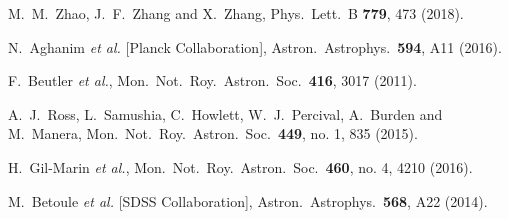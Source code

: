 \documentclass[aps,prd,nofootinbib,amsmath,amssymb,twocolumn,superscriptaddress,10pt]{revtex4}%
\begin{document}
\begin{thebibliography}{}
  M.~M.~Zhao, J.~F.~Zhang and X.~Zhang,
  Phys.\ Lett.\ B {\bf 779}, 473 (2018).

  N.~Aghanim {\it et al.} [Planck Collaboration],
  Astron.\ Astrophys.\  {\bf 594}, A11 (2016).




  F.~Beutler {\it et al.},
  Mon.\ Not.\ Roy.\ Astron.\ Soc.\  {\bf 416}, 3017 (2011).

  A.~J.~Ross, L.~Samushia, C.~Howlett, W.~J.~Percival, A.~Burden and M.~Manera,
  Mon.\ Not.\ Roy.\ Astron.\ Soc.\  {\bf 449}, no. 1, 835 (2015).

  H.~Gil-Marin {\it et al.},
  Mon.\ Not.\ Roy.\ Astron.\ Soc.\  {\bf 460}, no. 4, 4210 (2016).


  M.~Betoule {\it et al.} [SDSS Collaboration],
  Astron.\ Astrophys.\  {\bf 568}, A22 (2014).


\end{thebibliography}
\end{document}
